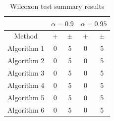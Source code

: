 \documentclass[a4paper,10pt]{article}
\begin{document}
 \clearpage 


\begin{table}[!htp]
\centering\scriptsize
\begin{tabular}{
|c|c|c|c|c|}
\hline
&\multicolumn{2}{c|}{$\alpha=0.9$} & \multicolumn{2}{c|}{$\alpha=0.95$}\\\hline
Method & + & $\pm$ & + & $\pm$ \\
\hline
Algorithm 1 & 0 & 5 & 0 & 5\\
\hline
Algorithm 2 & 0 & 5 & 0 & 5\\
\hline
Algorithm 3 & 0 & 5 & 0 & 5\\
\hline
Algorithm 4 & 0 & 5 & 0 & 5\\
\hline
Algorithm 5 & 0 & 5 & 0 & 5\\
\hline
Algorithm 6 & 0 & 5 & 0 & 5\\
\hline

\end{tabular}
\caption{Wilcoxon test summary results}

\end{table}

 \clearpage 
\end{document}
